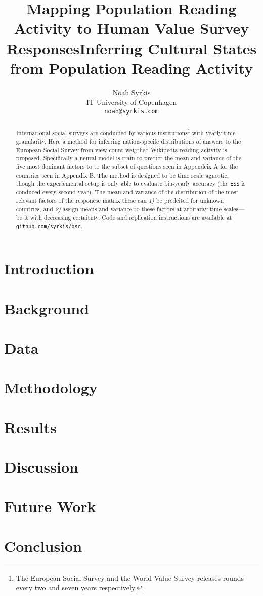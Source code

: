 \documentclass[11pt]{article}
\title{Mapping Population Reading Activity to Human Value Survey Responses}
\title{Inferring Cultural States from Population Reading Activity}
\author{Noah Syrkis \\
  IT University of Copenhagen \\
  \texttt{noah@syrkis.com} \\}
\begin{document}
\maketitle
\begin{abstract}
    International social surveys are conducted by various institutions\footnote{The European Social Survey and the World Value Survey releases rounds every two and seven years respectively.} with yearly time granularity.
    Here a method for inferring nation-specifc distributions of answers to the European Social Survey from view-count weigthed Wikipedia reading activity is proposed.
    Specifically a neural model is train to predict the mean and variance of the five most doninant factors to to the subset of questions seen in Appendeix A for the countries seen in Appendix B.
    The method is designed to be time scale agnostic, though the experiemental setup is only able to evaluate biu-yearly accuracy (the \texttt{ESS} is conduced every second year).
    The mean and variance of the distribution of the most relevant factors of the responese matrix these can \emph{1)} be predcited for unknown countries, and \emph{2)} assign means and variance to these factors at arbitaray time scales—be it with decreasing certaitnty.
    Code and replication instructions are available at \href{https://github.com/syrkis/bsc}{\texttt{github.com/syrkis/bsc}}.

\end{abstract}

\section{Introduction}


\section{Background}


\section{Data}


\section{Methodology}


\section{Results}


\section{Discussion}


\section{Future Work}


\section{Conclusion}



\end{document}

